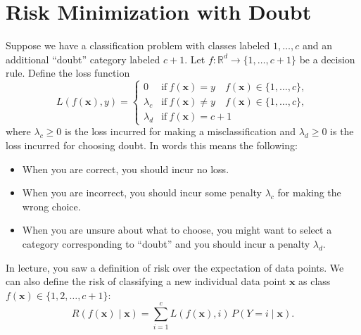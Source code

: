 \documentclass{article}
\newcommand{\Question}[1]{\Large \section{ #1 } \normalsize}
\renewcommand{\vec}[1]{\boldsymbol{\mathbf{#1}}}
\begin{document}
\newpage
\Question{Risk Minimization with Doubt}

Suppose we have a classification problem with classes labeled $1, \dotsc, c$ and an additional ``doubt'' category labeled $c+1$. Let $f : \mathbb{R}^d \to \{1, \dots, c+1 \}$ be a decision rule. Define the loss function
\begin{equation}
L(f(\vec{x}), y) =
\begin{cases}
0 &  						 \mathrm{if}\ f(\vec{x})=y \quad f(\vec{x}) \in\{1,\dotsc,c\}, \\
\lambda_c       & \mathrm{if}\ f(\vec{x})\neq y \quad f(\vec{x}) \in \{1,\dotsc,c\}, \\
\lambda_d       & \mathrm{if}\ f(\vec{x})=c+1
\end{cases}
\end{equation}
where $\lambda_c \geq 0$ is the loss incurred for making a misclassification and $\lambda_d \geq 0$ is the loss incurred for choosing doubt. In words this means the following:
\begin{itemize}
	\item When you are correct, you should incur no loss.
	\item When you are incorrect, you should incur some penalty $\lambda_c$ for making the wrong choice.
	\item When you are unsure about what to choose, you might want to select a category corresponding to ``doubt'' and you should incur a penalty $\lambda_d$.
\end{itemize}

In lecture, you saw a definition of risk over the expectation of data points. We can also define the risk of
classifying a new individual data point $\vec{x}$ as class $f(\vec{x}) \in
\{1,2,\dots,c+1\}$:
$$R(f(\vec{x}) \mid \vec{x}) = \sum_{i=1}^{c}
L(f(\vec{x}), i) \, P(Y=i \mid \vec{x}).$$ 
\end{document}
